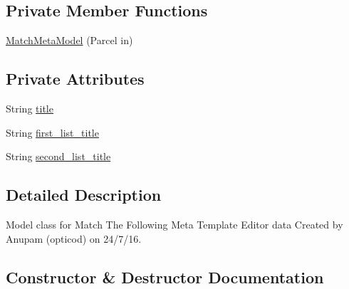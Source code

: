\subsection*{Private Member Functions}
\begin{DoxyCompactItemize}
\item 
\hyperlink{classorg_1_1buildmlearn_1_1matchtemplate_1_1data_1_1MatchMetaModel_ace265cd18d838afa9d323a91e1b8413e}{Match\+Meta\+Model} (Parcel in)
\end{DoxyCompactItemize}
\subsection*{Private Attributes}
\begin{DoxyCompactItemize}
\item 
String \hyperlink{classorg_1_1buildmlearn_1_1matchtemplate_1_1data_1_1MatchMetaModel_ad0538dfeaff3579670bac16b89418508}{title}
\item 
String \hyperlink{classorg_1_1buildmlearn_1_1matchtemplate_1_1data_1_1MatchMetaModel_a7902bcc17a8c3d338b1f13626dc1a428}{first\+\_\+list\+\_\+title}
\item 
String \hyperlink{classorg_1_1buildmlearn_1_1matchtemplate_1_1data_1_1MatchMetaModel_a68f3c989f8afddec58887daeea9610d9}{second\+\_\+list\+\_\+title}
\end{DoxyCompactItemize}


\subsection{Detailed Description}
Model class for Match The Following Meta Template Editor data Created by Anupam (opticod) on 24/7/16. 

\subsection{Constructor \& Destructor Documentation}

